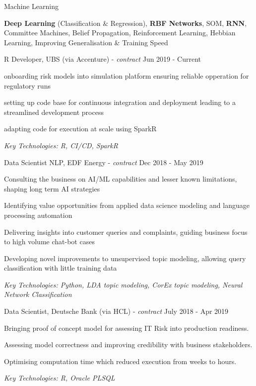 \documentclass[11pt,article,oneside]{memoir}
\newenvironment{itemize*}{%
  \renewcommand\labelitemi{\textbullet}
  \footnotesize
  \begin{itemize}%
    \setlength{\itemsep}{0pt}}%
  {\end{itemize}
}
\begin{document}
\ind Machine Learning 

\ind \hspace{0.354in} \footnotesize \textbf{Deep Learning} (Classification \& Regression), \textbf{RBF Networks}, SOM, \textbf{RNN}, Committee Machines,
Belief Propagation, Reinforcement Learning, Hebbian Learning, Improving Generalisation \& Training Speed \normalsize

\bigskip
 

\normalsize
\medskip
\ind R Developer, UBS (via Accenture) - \emph{contract} \hfill Jun 2019 - Current
\begin{itemize*}
    \item onboarding risk models into simulation platform ensuring reliable opperation for regulatory runs
    \item setting up code base for continuous integration and deployment leading to a streamlined development process
    \item adapting code for execution at scale using SparkR
\end{itemize*}
\ind \hspace{0.35in} \footnotesize \emph{Key Technologies: R, CI/CD, SparkR}

\normalsize
\medskip
\ind Data Scientist NLP, EDF Energy - \emph{contract} \hfill Dec 2018 - May 2019
\begin{itemize*}
    \item Consulting the business on AI/ML capabilities and lesser known limitations, shaping long term AI strategies
    \item Identifying value opportunities from applied data science modeling and language processing automation
    \item Delivering insights into customer queries and complaints, guiding business focus to high volume chat-bot cases
    \item Developing novel improvements to unsupervised topic modeling, allowing query classification with little training data  
\end{itemize*}
\ind \hspace{0.35in} \footnotesize \emph{Key Technologies: Python, LDA topic modeling, CorEx topic modeling, Neural Network Classification }

\normalsize
\medskip
\ind Data Scientist, Deutsche Bank (via HCL) - \emph{contract} \hfill July 2018 - Apr 2019
\begin{itemize*}
    \item Bringing proof of concept model for assessing IT Risk into production readiness.
    \item Assessing model correctness and improving credibility with business stakeholders. 
    \item Optimising computation time which reduced execution from weeks to hours.
\end{itemize*}
\ind \hspace{0.35in} \footnotesize \emph{Key Technologies: R, Oracle PLSQL}
\end{document}
